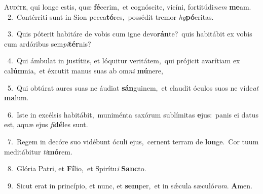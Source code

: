 \lettrine{\initial\textcolor{\initialcolor}{A}}{udíte,} qui longe estis, quæ \textbf{fé}\-cerim,~\star et cognóscite, vicíni, fortitúdi\textit{nem} \textbf{me}\-am.\\
{\numbfont\textcolor{\numbcolor}{~2.}}~Contérriti sunt in Sion pecca\-\textbf{tó}\-res,~\star possédit tremor \textit{hy}\-\textbf{pó}critas.\par
{\numbfont\textcolor{\numbcolor}{~3.}}~Quis póterit habitáre de vobis cum igne devo\-\textbf{rán}\-te?~\star quis habitábit ex vobis cum ardóribus sem\-\textit{pi}\-\textbf{tér}nis?\par
{\numbfont\textcolor{\numbcolor}{~4.}}~Qui ámbulat in justítiis, et lóquitur veritátem,~\dagger qui prójicit avarítiam ex ca\-\textbf{lúm}\-nia,~\star et éxcutit manus suas ab om\textit{ni} \textbf{mú}\-nere,\par
{\numbfont\textcolor{\numbcolor}{~5.}}~Qui obtúrat aures suas ne áudiat \textbf{sán}\-guinem,~\star et claudit óculos suos ne víde\textit{at} \textbf{ma}\-lum.\par
{\numbfont\textcolor{\numbcolor}{~6.}}~Iste in excélsis habitábit,~\dagger muniménta saxórum sublímitas \textbf{e}\-jus:~\star panis ei datus est, aquæ ejus \textit{fi}\-\textbf{dé}les sunt.\par
{\numbfont\textcolor{\numbcolor}{~7.}}~Regem in decóre suo vidébunt óculi ejus,~\dagger cernent terram de \textbf{lon}\-ge.~\star Cor tuum meditábitur \textit{ti}\-\textbf{mó}rem.\par
{\numbfont\textcolor{\numbcolor}{~8.}}~Glória Patri, et \textbf{Fí}\-lio,~\star et Spirítu\textit{i} \textbf{Sanc}\-to.\par
{\numbfont\textcolor{\numbcolor}{~9.}}~Sicut erat in princípio, et nunc, et \textbf{sem}\-per,~\star et in sǽcula sæculó\-\textit{rum}\-. \textbf{A}\-men.\par
